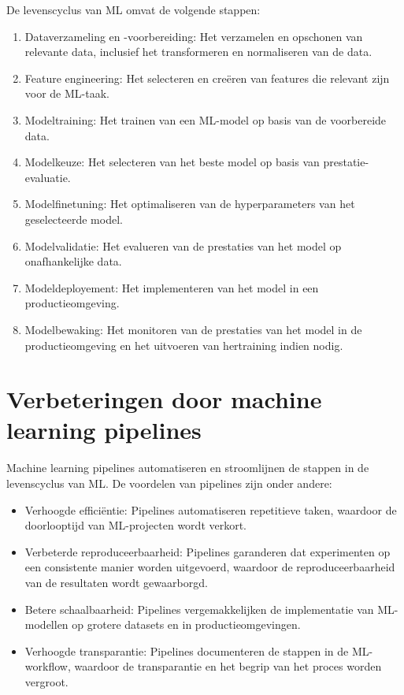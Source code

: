 De levenscyclus van ML omvat de volgende stappen:
\begin{enumerate}[label=\arabic*.]
    \item Dataverzameling en -voorbereiding: Het verzamelen en opschonen van relevante data, inclusief het transformeren en normaliseren van de data.
    \item Feature engineering: Het selecteren en creëren van features die relevant zijn voor de ML-taak.
    \item Modeltraining: Het trainen van een ML-model op basis van de voorbereide data.
    \item Modelkeuze: Het selecteren van het beste model op basis van prestatie-evaluatie.
    \item Modelfinetuning: Het optimaliseren van de hyperparameters van het geselecteerde model.
    \item Modelvalidatie: Het evalueren van de prestaties van het model op onafhankelijke data.
    \item Modeldeployement: Het implementeren van het model in een productieomgeving.
    \item Modelbewaking: Het monitoren van de prestaties van het model in de productieomgeving en het uitvoeren van hertraining indien nodig.
\end{enumerate}

\section{Verbeteringen door machine learning pipelines}

Machine learning pipelines automatiseren en stroomlijnen de stappen in de levenscyclus van ML. De voordelen van pipelines zijn onder andere:
\begin{itemize}
    \item Verhoogde efficiëntie: Pipelines automatiseren repetitieve taken, waardoor de doorlooptijd van ML-projecten wordt verkort.
    \item Verbeterde reproduceerbaarheid: Pipelines garanderen dat experimenten op een consistente manier worden uitgevoerd, waardoor de reproduceerbaarheid van de resultaten wordt gewaarborgd.
    \item Betere schaalbaarheid: Pipelines vergemakkelijken de implementatie van ML-modellen op grotere datasets en in productieomgevingen.
    \item Verhoogde transparantie: Pipelines documenteren de stappen in de ML-workflow, waardoor de transparantie en het begrip van het proces worden vergroot.
\end{itemize}

